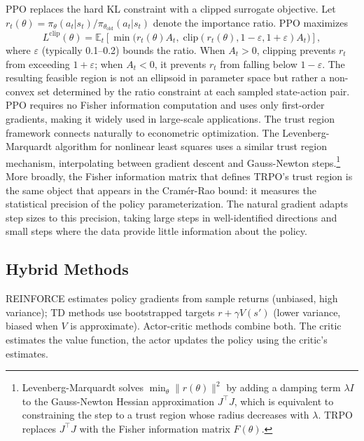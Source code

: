 PPO \citep{Schulman2017} replaces the hard KL constraint with a clipped surrogate objective. Let $r_t(\theta) = \pi_\theta(a_t|s_t) / \pi_{\theta_{\mathrm{old}}}(a_t|s_t)$ denote the importance ratio. PPO maximizes
\begin{equation}
\label{eq:ppo}
L^{\mathrm{clip}}(\theta) = \mathbb{E}_t \left[ \min\!\big( r_t(\theta) A_t, \; \mathrm{clip}(r_t(\theta), 1-\varepsilon, 1+\varepsilon) A_t \big) \right],
\end{equation}
where $\varepsilon$ (typically 0.1--0.2) bounds the ratio. When $A_t > 0$, clipping prevents $r_t$ from exceeding $1+\varepsilon$; when $A_t < 0$, it prevents $r_t$ from falling below $1-\varepsilon$. The resulting feasible region is not an ellipsoid in parameter space but rather a non-convex set determined by the ratio constraint at each sampled state-action pair. PPO requires no Fisher information computation and uses only first-order gradients, making it widely used in large-scale applications. 
The trust region framework connects naturally to econometric optimization. The Levenberg-Marquardt algorithm for nonlinear least squares uses a similar trust region mechanism, interpolating between gradient descent and Gauss-Newton steps.\footnote{Levenberg-Marquardt solves $\min_\theta \|r(\theta)\|^2$ by adding a damping term $\lambda I$ to the Gauss-Newton Hessian approximation $J^\top J$, which is equivalent to constraining the step to a trust region whose radius decreases with $\lambda$. TRPO replaces $J^\top J$ with the Fisher information matrix $F(\theta)$.} More broadly, the Fisher information matrix that defines TRPO's trust region is the same object that appears in the Cram\'er-Rao bound: it measures the statistical precision of the policy parameterization. The natural gradient adapts step sizes to this precision, taking large steps in well-identified directions and small steps where the data provide little information about the policy.


\subsection{Hybrid Methods}
\label{sec:actor_critic}

REINFORCE estimates policy gradients from sample returns (unbiased, high variance); TD methods use bootstrapped targets $r + \gamma V(s')$ (lower variance, biased when $V$ is approximate). Actor-critic methods combine both. The critic estimates the value function, the actor updates the policy using the critic's estimates.

